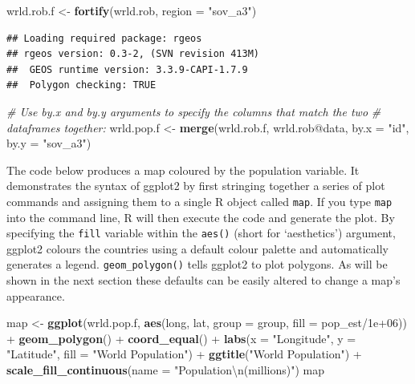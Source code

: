 \documentclass[]{article}
\newenvironment{Shaded}{}{}
\newcommand{\KeywordTok}[1]{\textcolor[rgb]{0.00,0.44,0.13}{\textbf{{#1}}}}
\newcommand{\DataTypeTok}[1]{\textcolor[rgb]{0.56,0.13,0.00}{{#1}}}
\newcommand{\FloatTok}[1]{\textcolor[rgb]{0.25,0.63,0.44}{{#1}}}
\newcommand{\CharTok}[1]{\textcolor[rgb]{0.25,0.44,0.63}{{#1}}}
\newcommand{\StringTok}[1]{\textcolor[rgb]{0.25,0.44,0.63}{{#1}}}
\newcommand{\CommentTok}[1]{\textcolor[rgb]{0.38,0.63,0.69}{\textit{{#1}}}}
\newcommand{\NormalTok}[1]{{#1}}
\begin{document}
\begin{Shaded}
\begin{Highlighting}[]
\NormalTok{wrld.rob.f <- }\KeywordTok{fortify}\NormalTok{(wrld.rob, }\DataTypeTok{region =} \StringTok{"sov_a3"}\NormalTok{)}
\end{Highlighting}
\end{Shaded}

\begin{verbatim}
## Loading required package: rgeos
## rgeos version: 0.3-2, (SVN revision 413M)
##  GEOS runtime version: 3.3.9-CAPI-1.7.9 
##  Polygon checking: TRUE
\end{verbatim}

\begin{Shaded}
\begin{Highlighting}[]

\CommentTok{# Use by.x and by.y arguments to specify the columns that match the two}
\CommentTok{# dataframes together:}
\NormalTok{wrld.pop.f <- }\KeywordTok{merge}\NormalTok{(wrld.rob.f, wrld.rob@data, }\DataTypeTok{by.x =} \StringTok{"id"}\NormalTok{, }\DataTypeTok{by.y =} \StringTok{"sov_a3"}\NormalTok{)}
\end{Highlighting}
\end{Shaded}

The code below produces a map coloured by the population variable. It
demonstrates the syntax of ggplot2 by first stringing together a series
of plot commands and assigning them to a single R object called
\texttt{map}. If you type \texttt{map} into the command line, R will
then execute the code and generate the plot. By\\specifying the
\texttt{fill} variable within the \texttt{aes()} (short for
`aesthetics') argument, ggplot2 colours the countries using a default
colour palette and automatically generates a legend.
\texttt{geom\_polygon()} tells ggplot2 to plot polygons. As will be
shown in the next section these defaults can be easily altered to change
a map's appearance.

\begin{Shaded}
\begin{Highlighting}[]
\NormalTok{map <- }\KeywordTok{ggplot}\NormalTok{(wrld.pop.f, }\KeywordTok{aes}\NormalTok{(long, lat, }\DataTypeTok{group =} \NormalTok{group, }\DataTypeTok{fill =} \NormalTok{pop_est/}\FloatTok{1e+06}\NormalTok{)) + }
    \KeywordTok{geom_polygon}\NormalTok{() + }\KeywordTok{coord_equal}\NormalTok{() + }\KeywordTok{labs}\NormalTok{(}\DataTypeTok{x =} \StringTok{"Longitude"}\NormalTok{, }\DataTypeTok{y =} \StringTok{"Latitude"}\NormalTok{, }\DataTypeTok{fill =} \StringTok{"World Population"}\NormalTok{) + }
    \KeywordTok{ggtitle}\NormalTok{(}\StringTok{"World Population"}\NormalTok{) + }\KeywordTok{scale_fill_continuous}\NormalTok{(}\DataTypeTok{name =} \StringTok{"Population}\CharTok{\textbackslash{}n}\StringTok{(millions)"}\NormalTok{)}
\NormalTok{map}
\end{Highlighting}
\end{Shaded}
\end{document}
